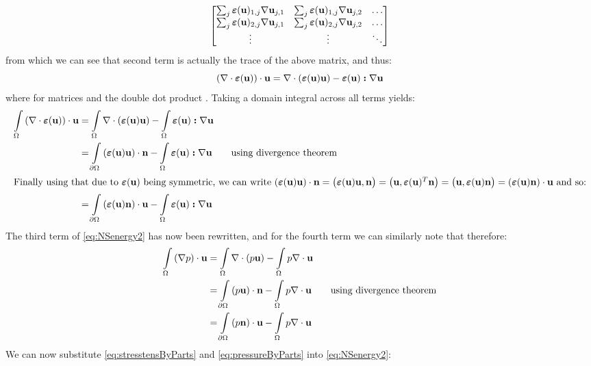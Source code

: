 \[
\begin{bmatrix}
\sum_{j}\bm{\varepsilon}({\textbf{u}})_{1,j}\nabla{\textbf{u}}_{j,1} & \sum_{j}\bm{\varepsilon}({\textbf{u}})_{1,j}\nabla{\textbf{u}}_{j,2} & \hdots \\
\sum_{j}\bm{\varepsilon}({\textbf{u}})_{2,j}\nabla{\textbf{u}}_{j,1} & \sum_{j}\bm{\varepsilon}({\textbf{u}})_{2,j}\nabla{\textbf{u}}_{j,2} & \hdots \\
\vdots  & \vdots  & \ddots
\end{bmatrix}
\]
from which we can see that second term is actually the trace of the above matrix, and thus:
\begin{equation*}
\qty(\nabla\cdot\bm{\varepsilon}({\textbf{u}}))\cdot{\textbf{u}} = \nabla\cdot\qty(\bm{\varepsilon}({\textbf{u}}){\textbf{u}}) - \bm{\varepsilon}({\textbf{u}})\bm{:}\nabla{\textbf{u}}
\end{equation*}
where for matrices  and  the double dot product . Taking a domain integral across all terms yields:
\begin{align}
    \int\limits_{\Omega}\qty(\nabla\cdot\bm{\varepsilon}({\textbf{u}}))\cdot{\textbf{u}} &= \int\limits_{\Omega}\nabla\cdot\qty(\bm{\varepsilon}({\textbf{u}}){\textbf{u}}) - \int\limits_{\Omega}\bm{\varepsilon}({\textbf{u}})\bm{:}\nabla{\textbf{u}} \notag\\
            &= \int\limits_{\partial\Omega}\qty(\bm{\varepsilon}({\textbf{u}}){\textbf{u}})\cdot{\textbf{n}} - \int\limits_{\Omega}\bm{\varepsilon}({\textbf{u}})\bm{:}\nabla{\textbf{u}} \tag*{using divergence theorem}\\
            \intertext{Finally using that due to \(\bm{\varepsilon}({\textbf{u}})\) being symmetric, we can write \(\qty(\bm{\varepsilon}({\textbf{u}}){\textbf{u}})\cdot{\textbf{n}}= \big(\bm{\varepsilon}({\textbf{u}}){\textbf{u}},{\textbf{n}}\big) = \big({\textbf{u}},\bm{\varepsilon}({\textbf{u}})^T{\textbf{n}}\big) = \big({\textbf{u}},\bm{\varepsilon}({\textbf{u}}){\textbf{n}}\big) = \qty(\bm{\varepsilon}({\textbf{u}}){\textbf{n}})\cdot{\textbf{u}}\) and so:}
            &= \int\limits_{\partial\Omega}\qty(\bm{\varepsilon}({\textbf{u}}){\textbf{n}})\cdot{\textbf{u}} - \int\limits_{\Omega}\bm{\varepsilon}({\textbf{u}})\bm{:}\nabla{\textbf{u}} \label{eq:stresstensByParts}
\end{align}
The third term of \eqref{eq:NSenergy2} has now been rewritten, and for the fourth term we can similarly note that  therefore:
\begin{align}
    \int\limits_{\Omega}\qty(\nabla p)\cdot{\textbf{u}} &= \int\limits_{\Omega}\nabla\cdot\qty(p{\textbf{u}}) - \int\limits_{\Omega}  p\nabla\cdot{\textbf{u}} \notag\\
                    &= \int\limits_{\partial\Omega}\qty(p{\textbf{u}})\cdot{\textbf{n}} - \int\limits_{\Omega}  p\nabla\cdot{\textbf{u}} \tag*{using divergence theorem}\\
                    &= \int\limits_{\partial\Omega}\qty(p{\textbf{n}})\cdot{\textbf{u}} - \int\limits_{\Omega}  p\nabla\cdot{\textbf{u}}\label{eq:pressureByParts}
\end{align}
 We can now substitute \eqref{eq:stresstensByParts} and \eqref{eq:pressureByParts} into \eqref{eq:NSenergy2}:
